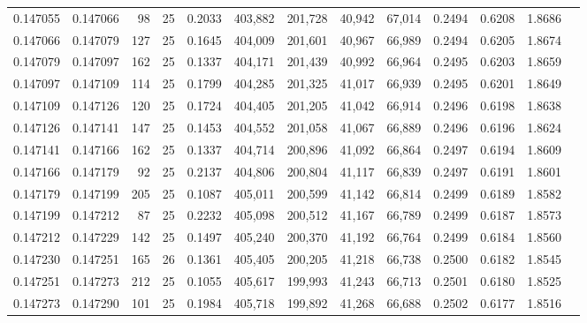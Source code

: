 \begin{tabular}{rrrrrrrrrrrrr}
0.147055 & 0.147066 &    98 &  25 &                                     0.2033 & 403,882 & 201,728 &  40,942 &  67,014 & 0.2494 & 0.6208 & 1.8686 \\
0.147066 & 0.147079 &   127 &  25 &                                     0.1645 & 404,009 & 201,601 &  40,967 &  66,989 & 0.2494 & 0.6205 & 1.8674 \\
0.147079 & 0.147097 &   162 &  25 &                                     0.1337 & 404,171 & 201,439 &  40,992 &  66,964 & 0.2495 & 0.6203 & 1.8659 \\
0.147097 & 0.147109 &   114 &  25 &                                     0.1799 & 404,285 & 201,325 &  41,017 &  66,939 & 0.2495 & 0.6201 & 1.8649 \\
0.147109 & 0.147126 &   120 &  25 &                                     0.1724 & 404,405 & 201,205 &  41,042 &  66,914 & 0.2496 & 0.6198 & 1.8638 \\
0.147126 & 0.147141 &   147 &  25 &                                     0.1453 & 404,552 & 201,058 &  41,067 &  66,889 & 0.2496 & 0.6196 & 1.8624 \\
0.147141 & 0.147166 &   162 &  25 &                                     0.1337 & 404,714 & 200,896 &  41,092 &  66,864 & 0.2497 & 0.6194 & 1.8609 \\
0.147166 & 0.147179 &    92 &  25 &                                     0.2137 & 404,806 & 200,804 &  41,117 &  66,839 & 0.2497 & 0.6191 & 1.8601 \\
0.147179 & 0.147199 &   205 &  25 &                                     0.1087 & 405,011 & 200,599 &  41,142 &  66,814 & 0.2499 & 0.6189 & 1.8582 \\
0.147199 & 0.147212 &    87 &  25 &                                     0.2232 & 405,098 & 200,512 &  41,167 &  66,789 & 0.2499 & 0.6187 & 1.8573 \\
0.147212 & 0.147229 &   142 &  25 &                                     0.1497 & 405,240 & 200,370 &  41,192 &  66,764 & 0.2499 & 0.6184 & 1.8560 \\
0.147230 & 0.147251 &   165 &  26 &                                     0.1361 & 405,405 & 200,205 &  41,218 &  66,738 & 0.2500 & 0.6182 & 1.8545 \\
0.147251 & 0.147273 &   212 &  25 &                                     0.1055 & 405,617 & 199,993 &  41,243 &  66,713 & 0.2501 & 0.6180 & 1.8525 \\
0.147273 & 0.147290 &   101 &  25 &                                     0.1984 & 405,718 & 199,892 &  41,268 &  66,688 & 0.2502 & 0.6177 & 1.8516 \\

\end{tabular}
